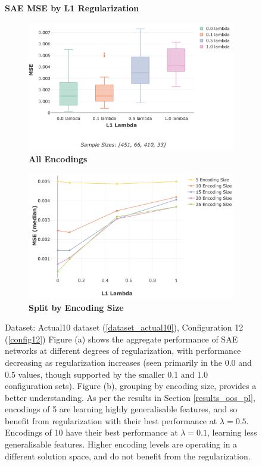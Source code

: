 \documentclass[a4paper,11pt,oneside]{article}
\theoremstyle{plain}
\theoremstyle{definition}
\begin{document}
	\begin{figure}[H]
	\centering
	\textbf{SAE MSE by L1 Regularization}
	\begin{subfigure}{.99\textwidth}
		\centering 
		\includegraphics[scale=0.4]{images/results/8_6_complexity/actual_mse_reg.png}
		\caption{\textbf{All Encodings} 
			\newline }
		\label{figure-actual_mse_reg}
	\end{subfigure}
	\begin{subfigure}{.99\textwidth}
		\centering 
		\includegraphics[scale=0.4]{images/results/8_6_complexity/actual_sae_mse_by_encoding.png}
		\caption{\textbf{Split by Encoding Size} 
			\newline }
		\label{figure-actual_sae_mse_by_encoding}
	\end{subfigure}
	\caption[SAE MSE by L1 Regularization]
	{Dataset: Actual10 dataset (\ref{dataset_actual10}), Configuration 12 (\ref{config12})
		\newline Figure (a) shows the aggregate performance of SAE networks at different degrees of regularization, with performance decreasing as regularization increases (seen primarily in the 0.0 and 0.5 values, though supported by the smaller 0.1 and 1.0 configuration sets). Figure (b), grouping by encoding size, provides a better understanding. As per the results in Section \ref{results_oos_pl}, encodings of 5 are learning highly generalisable features, and so benefit from regularization with their best performance at $\lambda = 0.5$. Encodings of 10 have their best performance at $\lambda = 0.1$, learning less generalisable features. Higher encoding levels are operating in a different solution space, and do not benefit from the regularization.
}
\end{figure}
\end{document}
